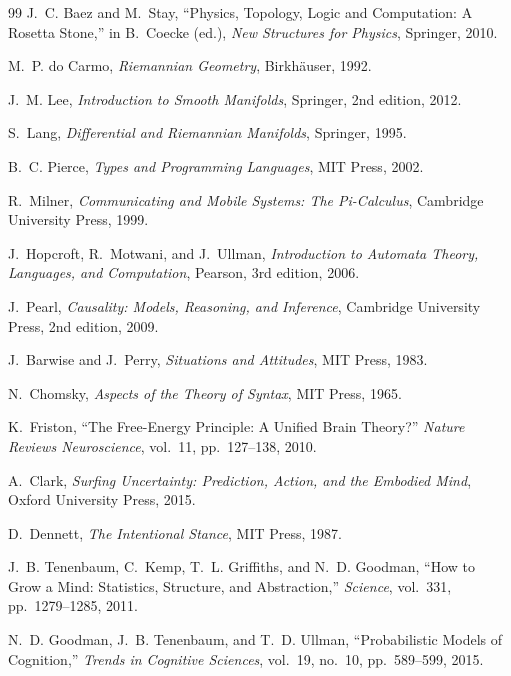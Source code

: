 \documentclass[11pt,a4paper]{article}
\theoremstyle{definition}
\theoremstyle{remark}
\begin{document}
\begin{thebibliography}{99}
J.~C. Baez and M.~Stay,
\newblock ``Physics, Topology, Logic and Computation: A Rosetta Stone,''
\newblock in B.~Coecke (ed.), \emph{New Structures for Physics}, Springer, 2010.

M.~P. do Carmo,
\newblock \emph{Riemannian Geometry},
\newblock Birkh\"{a}user, 1992.

J.~M. Lee,
\newblock \emph{Introduction to Smooth Manifolds},
\newblock Springer, 2nd edition, 2012.

S.~Lang,
\newblock \emph{Differential and Riemannian Manifolds},
\newblock Springer, 1995.

B.~C. Pierce,
\newblock \emph{Types and Programming Languages},
\newblock MIT Press, 2002.

R.~Milner,
\newblock \emph{Communicating and Mobile Systems: The Pi-Calculus},
\newblock Cambridge University Press, 1999.

J.~Hopcroft, R.~Motwani, and J.~Ullman,
\newblock \emph{Introduction to Automata Theory, Languages, and Computation},
\newblock Pearson, 3rd edition, 2006.

J.~Pearl,
\newblock \emph{Causality: Models, Reasoning, and Inference},
\newblock Cambridge University Press, 2nd edition, 2009.

J.~Barwise and J.~Perry,
\newblock \emph{Situations and Attitudes},
\newblock MIT Press, 1983.

N.~Chomsky,
\newblock \emph{Aspects of the Theory of Syntax},
\newblock MIT Press, 1965.

K.~Friston,
\newblock ``The Free-Energy Principle: A Unified Brain Theory?''
\newblock \emph{Nature Reviews Neuroscience}, vol.~11, pp.~127--138, 2010.

A.~Clark,
\newblock \emph{Surfing Uncertainty: Prediction, Action, and the Embodied Mind},
\newblock Oxford University Press, 2015.

D.~Dennett,
\newblock \emph{The Intentional Stance},
\newblock MIT Press, 1987.

J.~B. Tenenbaum, C.~Kemp, T.~L. Griffiths, and N.~D. Goodman,
\newblock ``How to Grow a Mind: Statistics, Structure, and Abstraction,''
\newblock \emph{Science}, vol.~331, pp.~1279--1285, 2011.

N.~D. Goodman, J.~B. Tenenbaum, and T.~D. Ullman,
\newblock ``Probabilistic Models of Cognition,''
\newblock \emph{Trends in Cognitive Sciences}, vol.~19, no.~10, pp.~589--599, 2015.


\end{thebibliography}
\end{document}

